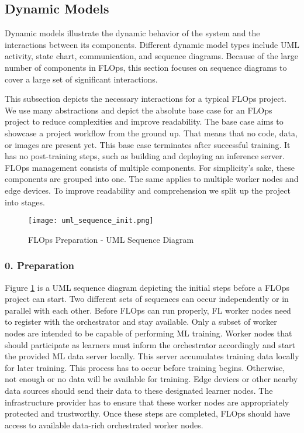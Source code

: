 \subsection{Dynamic Models}

Dynamic models illustrate the dynamic behavior of the system and the interactions between its components.
Different dynamic model types include UML activity, state chart, communication, and sequence diagrams.
Because of the large number of components in FLOps, this section focuses on sequence diagrams to cover a large set of significant interactions.

This subsection depicts the necessary interactions for a typical FLOps project.
We use many abstractions and depict the absolute base case for an FLOps project to reduce complexities and improve readability.
The base case aims to showcase a project workflow from the ground up.
That means that no code, data, or images are present yet.
This base case terminates after successful training.
It has no post-training steps, such as building and deploying an inference server.
FLOps management consists of multiple components.
For simplicity's sake, these components are grouped into one. 
The same applies to multiple worker nodes and edge devices.
To improve readability and comprehension we split up the project into stages.

\begin{figure}[h]
    \begin{adjustwidth}{-0.1\paperwidth}{-0.1\paperwidth}
        \centering
        \texttt{[image: uml\_sequence\_init.png]}
        \caption{FLOps Preparation - UML Sequence Diagram}
        \label{fig:uml_sequence_init}
    \end{adjustwidth}
\end{figure}

\pagebreak
\subsubsection{0. Preparation}
Figure \ref{fig:uml_sequence_init} is a UML sequence diagram depicting the initial steps before a FLOps project can start.
Two different sets of sequences can occur independently or in parallel with each other.
Before FLOps can run properly, FL worker nodes need to register with the orchestrator and stay available.
Only a subset of worker nodes are intended to be capable of performing ML training.
Worker nodes that should participate as learners must inform the orchestrator accordingly and start the provided ML data server locally.
This server accumulates training data locally for later training.
This process has to occur before training begins.
Otherwise, not enough or no data will be available for training.
Edge devices or other nearby data sources should send their data to these designated learner nodes.
The infrastructure provider has to ensure that these worker nodes are appropriately protected and trustworthy.
Once these steps are completed, FLOps should have access to available data-rich orchestrated worker nodes.

